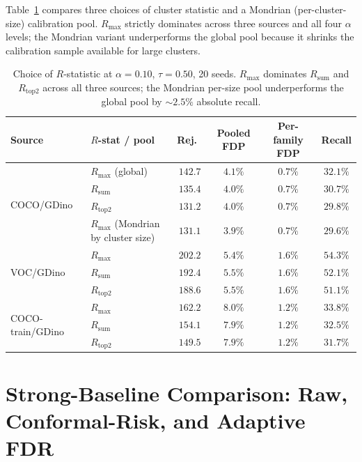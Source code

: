 \documentclass{article}
\theoremstyle{remark}
\newcommand{\1}{\mathbf{1}}
\begin{document}
Table~\ref{tab:rstat_ablation} compares three choices of cluster
statistic and a Mondrian (per-cluster-size) calibration pool. $R_{\max}$
strictly dominates across three sources and all four $\alpha$ levels;
the Mondrian variant underperforms the global pool because it shrinks
the calibration sample available for large clusters.

\begin{table}[h]
\centering
\small
\begin{tabular*}{\linewidth}{@{\extracolsep{\fill}}llcccc@{}}
\toprule
Source & $R$-stat / pool & Rej.\ & Pooled FDP & Per-family FDP & Recall \\
\midrule
\multirow{4}{*}{COCO/GDino}
 & $R_{\max}$ (global)                  & $142.7$ & $4.1\%$ & $0.7\%$ & $\mathbf{32.1\%}$ \\
 & $R_{\mathrm{sum}}$                    & $135.4$ & $4.0\%$ & $0.7\%$ & $30.7\%$ \\
 & $R_{\mathrm{top2}}$                   & $131.2$ & $4.0\%$ & $0.7\%$ & $29.8\%$ \\
 & $R_{\max}$ (Mondrian by cluster size)& $131.1$ & $3.9\%$ & $0.7\%$ & $29.6\%$ \\
\midrule
\multirow{3}{*}{VOC/GDino}
 & $R_{\max}$                            & $202.2$ & $5.4\%$ & $1.6\%$ & $\mathbf{54.3\%}$ \\
 & $R_{\mathrm{sum}}$                    & $192.4$ & $5.5\%$ & $1.6\%$ & $52.1\%$ \\
 & $R_{\mathrm{top2}}$                   & $188.6$ & $5.5\%$ & $1.6\%$ & $51.1\%$ \\
\midrule
\multirow{3}{*}{COCO-train/GDino}
 & $R_{\max}$                            & $162.2$ & $8.0\%$ & $1.2\%$ & $\mathbf{33.8\%}$ \\
 & $R_{\mathrm{sum}}$                    & $154.1$ & $7.9\%$ & $1.2\%$ & $32.5\%$ \\
 & $R_{\mathrm{top2}}$                   & $149.5$ & $7.9\%$ & $1.2\%$ & $31.7\%$ \\
\bottomrule
\end{tabular*}
\caption{Choice of $R$-statistic at $\alpha=0.10$, $\tau=0.50$,
20 seeds. $R_{\max}$ dominates $R_{\mathrm{sum}}$ and $R_{\mathrm{top2}}$
across all three sources; the Mondrian per-size pool underperforms the
global pool by $\sim2.5\%$ absolute recall.}
\label{tab:rstat_ablation}
\end{table}

\section{Strong-Baseline Comparison: Raw, Conformal-Risk, and Adaptive FDR}
\label{app:strong_baselines}
\end{document}
